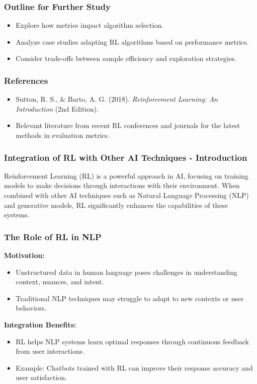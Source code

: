 \documentclass[aspectratio=169]{beamer}
\begin{document}
\begin{frame}[fragile]
    \frametitle{Outline for Further Study}
    \begin{itemize}
        \item Explore how metrics impact algorithm selection.
        \item Analyze case studies adapting RL algorithms based on performance metrics.
        \item Consider trade-offs between sample efficiency and exploration strategies.
    \end{itemize}
\end{frame}

\begin{frame}[fragile]
    \frametitle{References}
    \begin{itemize}
        \item Sutton, R. S., \& Barto, A. G. (2018). \textit{Reinforcement Learning: An Introduction} (2nd Edition).
        \item Relevant literature from recent RL conferences and journals for the latest methods in evaluation metrics.
    \end{itemize}
\end{frame}

\begin{frame}[fragile]
    \frametitle{Integration of RL with Other AI Techniques - Introduction}
    Reinforcement Learning (RL) is a powerful approach in AI, focusing on training models to make decisions through interactions with their environment. 
    When combined with other AI techniques such as Natural Language Processing (NLP) and generative models, RL significantly enhances the capabilities of these systems.
\end{frame}

\begin{frame}[fragile]
    \frametitle{The Role of RL in NLP}
    \textbf{Motivation:}
    \begin{itemize}
        \item Unstructured data in human language poses challenges in understanding context, nuances, and intent.
        \item Traditional NLP techniques may struggle to adapt to new contexts or user behaviors.
    \end{itemize}
    
    \textbf{Integration Benefits:}
    \begin{itemize}
        \item RL helps NLP systems learn optimal responses through continuous feedback from user interactions.
        \item Example: Chatbots trained with RL can improve their response accuracy and user satisfaction.
    \end{itemize}
\end{frame}
\end{document}
